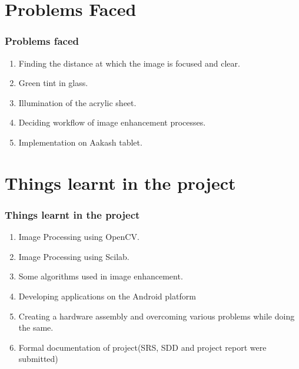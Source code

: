 \documentclass[12pt]{beamer}
\begin{document}
\section{Problems Faced}
\begin{frame}[c]
\frametitle{Problems faced}
\begin{enumerate}
\item \vskip-30pt Finding the distance at which the image is focused and clear.
\item Green tint in glass.
\item Illumination of the acrylic sheet.
\item Deciding workflow of image enhancement processes.
\item Implementation on Aakash tablet.
\end{enumerate}
\end{frame}

\section{Things learnt in the project}
\begin{frame}[c]
\frametitle{Things learnt in the project}
\begin{enumerate}
\item \vskip-30pt Image Processing using OpenCV.
\item Image Processing using Scilab.
\item Some algorithms used in image enhancement.
\item Developing applications on the Android platform
\item Creating a hardware assembly and overcoming various problems while doing the same.
\item Formal documentation of project(SRS, SDD and project report were submitted)
\end{enumerate}
\end{frame}
\end{document}

